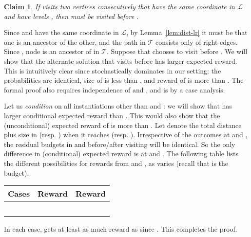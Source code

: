 \documentclass[11pt,letterpaper]{article}
\newtheorem{claim}[theorem]{Claim}
\numberwithin{algorithm}{section}
\newenvironment{proof}{

\noindent{\bf Proof:}}
{\hfill


}
\newcommand{\lm}[0]{{\ensuremath{\mathcal{L}}}\xspace}
\newcommand{\T}{\ensuremath{\mathcal{T}}\xspace}
\begin{document}
\begin{claim}\label{cl:line-na-ties}
If  visits two vertices  consecutively that have the same coordinate in \lm and have levels , then  must be visited before .
\end{claim}
\begin{proof}
Since  and  have the same coordinate in \lm, by Lemma~\ref{lem:dist-lr} it must be that  one is an ancestor of the other, and the  path in \T consists only of right-edges. Since , node  is an ancestor of  in \T. Suppose that  chooses to visit  before . We will show that the alternate solution \oN that visits  before  has larger expected reward. This is intuitively clear since  stochastically dominates  in our setting: the probabilities are identical, size of  is less than , and reward of  is more than . The formal proof also requires independence of  and , and is by a case analysis.

Let us {\em condition} on all instantiations other than  and : we will show that \oN has larger conditional expected reward than . This would also show that the (unconditional) expected reward of \oN is more than . Let  denote the total distance plus size in  (resp. \oN) when it reaches  (resp. ). Irrespective of the outcomes at  and , the residual budgets in  and  before/after visiting  will be identical. So the only difference in (conditional) expected reward is at  and . The following table lists the different possibilities for  rewards from  and , as  varies (recall that  is the budget).
\begin{center}
{\renewcommand{\arraystretch}{1.5}
\renewcommand{\tabcolsep}{0.2cm}\begin{tabular}{|c|c|c|}
\hline  Cases & Reward  & Reward  \\
\hline  &  &  \\
\hline  &  &  \\
\hline  &  &  \\
\hline  &  &  \\
\hline  &  &  \\
\hline
\end{tabular}}
\end{center}
In each case,  gets at least as much reward as  since . This completes the proof.
\end{proof}
\end{document}
